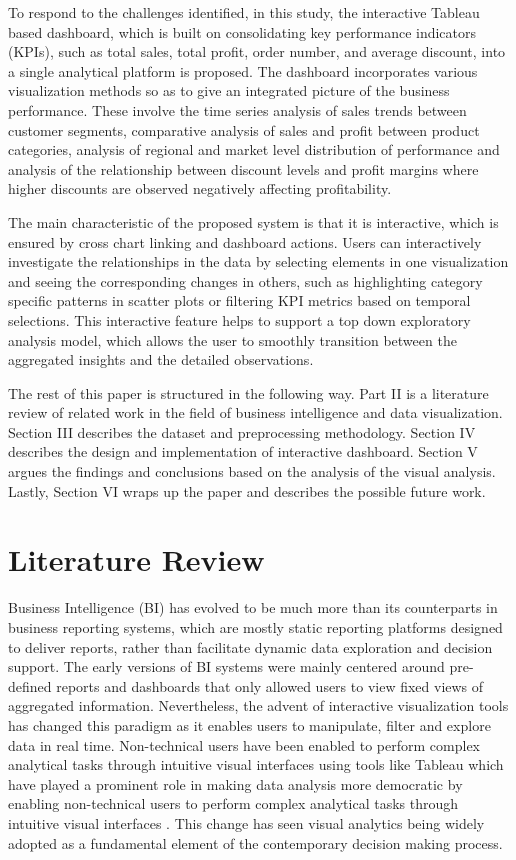 \documentclass[conference]{IEEEtran}
\begin{document}
To respond to the challenges identified, in this study, the interactive Tableau based dashboard, which is built on consolidating key performance indicators (KPIs), such as total sales, total profit, order number, and average discount, into a single analytical platform is proposed. The dashboard incorporates various visualization methods so as to give an integrated picture of the business performance. These involve the time series analysis of sales trends between customer segments, comparative analysis of sales and profit between product categories, analysis of regional and market level distribution of performance and analysis of the relationship between discount levels and profit margins where higher discounts are observed negatively affecting profitability.

The main characteristic of the proposed system is that it is interactive, which is ensured by cross chart linking and dashboard actions. Users can interactively investigate the relationships in the data by selecting elements in one visualization and seeing the corresponding changes in others, such as highlighting category specific patterns in scatter plots or filtering KPI metrics based on temporal selections. This interactive feature helps to support a top down exploratory analysis model, which allows the user to smoothly transition between the aggregated insights and the detailed observations.

The rest of this paper is structured in the following way. Part II is a literature review of related work in the field of business intelligence and data visualization. Section III describes the dataset and preprocessing methodology. Section IV describes the design and implementation of interactive dashboard. Section V argues the findings and conclusions based on the analysis of the visual analysis. Lastly, Section VI wraps up the paper and describes the possible future work.
\section{Literature Review}

Business Intelligence (BI) has evolved to be much more than its counterparts in business reporting systems, which are mostly static reporting platforms designed to deliver reports, rather than facilitate dynamic data exploration and decision support. The early versions of BI systems were mainly centered around pre-defined reports and dashboards that only allowed users to view fixed views of aggregated information. Nevertheless, the advent of interactive visualization tools has changed this paradigm as it enables users to manipulate, filter and explore data in real time. Non-technical users have been enabled to perform complex analytical tasks through intuitive visual interfaces using tools like Tableau which have played a prominent role in making data analysis more democratic by enabling non-technical users to perform complex analytical tasks through intuitive visual interfaces \cite{few2006information, keim2002information}. This change has seen visual analytics being widely adopted as a fundamental element of the contemporary decision making process.
\end{document}
